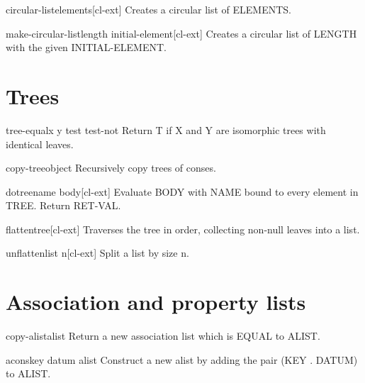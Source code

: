 \documentclass[10pt,english]{book}
\begin{document}
\begin{function}{circular-list}{\rest elements}[cl-ext]
  Creates a circular list of ELEMENTS.
\end{function}

\begin{function}{make-circular-list}{length \key initial-element}[cl-ext]
  Creates a circular list of LENGTH with the given INITIAL-ELEMENT.
\end{function}

\section{Trees}
\label{sec:trees}

\begin{function}{tree-equal}{x y \key test test-not}
  Return T if X and Y are isomorphic trees with identical leaves.
\end{function}

\begin{function}{copy-tree}{object}
  Recursively copy trees of conses.
\end{function}

\begin{macro}{dotree}{name \body body}[cl-ext]
  Evaluate BODY with NAME bound to every element in TREE. Return RET-VAL.
\end{macro}

\begin{function}{flatten}{tree}[cl-ext]
  Traverses the tree in order, collecting non-null leaves into a list.
\end{function}

\begin{function}{unflatten}{list n}[cl-ext]
  Split a list by size n.
\end{function}


\section{Association and property lists}
\label{sec:association-lists}

\begin{function}{copy-alist}{alist}
  Return a new association list which is EQUAL to ALIST.
\end{function}

\begin{function}{acons}{key datum alist}
  Construct a new alist by adding the pair (KEY . DATUM) to ALIST.
\end{function}
\end{document}
